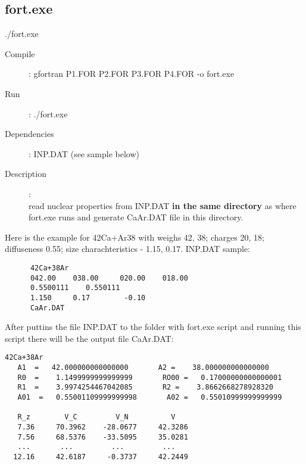 \documentclass[preprint,review,12pt]{elsarticle}
\begin{document}
  \subsection{fort.exe}
  \label{sec:fort}
    ./fort.exe    %
    \begin{description}
       \item[Compile]:  gfortran P1.FOR P2.FOR P3.FOR P4.FOR -o fort.exe
       \item[Run]: ./fort.exe
       
       \item [Dependencies]:
           \subitem   INP.DAT (see sample below)

       \item [Description]: \\
           read nuclear properties from INP.DAT \textbf{in the same directory} as where fort.exe runs and generate CaAr.DAT file in this directory.
           
    \end{description}
       Here is the example for 42Ca+Ar38 with weighs 42, 38; charges 20, 18; diffuseness 0.55; size charachteristics - 1.15, 0.17.
      INP.DAT sample:
    \begin{verbatim}
      42Ca+38Ar
      042.00    038.00     020.00    018.00
      0.5500111    0.550111
      1.150     0.17        -0.10
      CaAr.DAT
    \end{verbatim}  
    After puttins the file INP.DAT to the folder with fort.exe script and running this script there will be the output file CaAr.DAT:
    \begin{verbatim}
42Ca+38Ar                                                                       
   A1  =   42.000000000000000       A2 =    38.000000000000000     
   R0  =    1.1499999999999999       RO00 =   0.17000000000000001     
   R1  =    3.9974254467042085       R2 =    3.8662668278928320     
   A01  =   0.55001109999999998       A02 =   0.55010999999999999     

   R_z        V_C         V_N          V
   7.36     70.3962    -28.0677     42.3286
   7.56     68.5376    -33.5095     35.0281
   ...       ...         ...         ...
  12.16     42.6187     -0.3737     42.2449
    \end{verbatim}  
\end{document}
